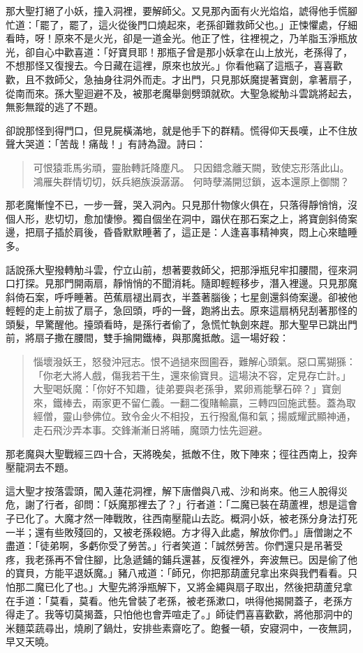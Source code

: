 那大聖打絕了小妖，撞入洞裡，要解師父。又見那內面有火光焰焰，諕得他手慌腳忙道：「罷了，罷了，這火從後門口燒起來，老孫卻難救師父也。」正悚懼處，仔細看時，呀！原來不是火光，卻是一道金光。他正了性，往裡視之，乃羊脂玉淨瓶放光，卻自心中歡喜道：「好寶貝耶！那瓶子曾是那小妖拿在山上放光，老孫得了，不想那怪又復搜去。今日藏在這裡，原來也放光。」你看他竊了這瓶子，喜喜歡歡，且不救師父，急抽身往洞外而走。才出門，只見那妖魔提著寶劍，拿著扇子，從南而來。孫大聖迴避不及，被那老魔舉劍劈頭就砍。大聖急縱觔斗雲跳將起去，無影無蹤的逃了不題。

卻說那怪到得門口，但見屍橫滿地，就是他手下的群精。慌得仰天長嘆，止不住放聲大哭道：「苦哉！痛哉！」有詩為證。詩曰：
\begin{quote}
可恨猿乖馬劣頑，靈胎轉託降塵凡。
只因錯念離天闕，致使忘形落此山。
鴻雁失群情切切，妖兵絕族淚潺潺。
何時孽滿開愆鎖，返本還原上御關？
\end{quote}

那老魔慚惶不已，一步一聲，哭入洞內。只見那什物傢火俱在，只落得靜悄悄，沒個人形，悲切切，愈加悽慘。獨自個坐在洞中，蹋伏在那石案之上，將寶劍斜倚案邊，把扇子插於肩後，昏昏默默睡著了，這正是：人逢喜事精神爽，悶上心來瞌睡多。

話說孫大聖撥轉觔斗雲，佇立山前，想著要救師父，把那淨瓶兒牢扣腰間，徑來洞口打探。見那門開兩扇，靜悄悄的不聞消耗。隨即輕輕移步，潛入裡邊。只見那魔斜倚石案，呼呼睡著。芭蕉扇褪出肩衣，半蓋著腦後；七星劍還斜倚案邊。卻被他輕輕的走上前拔了扇子，急回頭，呼的一聲，跑將出去。原來這扇柄兒刮著那怪的頭髮，早驚醒他。擡頭看時，是孫行者偷了，急慌忙執劍來趕。那大聖早已跳出門前，將扇子撒在腰間，雙手掄開鐵棒，與那魔抵敵。這一場好殺：
\begin{quote}
惱壞潑妖王，怒發沖冠志。恨不過撾來囫圇吞，難解心頭氣。惡口罵猢猻：「你老大將人戲，傷我若干生，還來偷寶貝。這場決不容，定見存亡計。」大聖喝妖魔：「你好不知趣，徒弟要與老孫爭，累卵焉能擊石碎？」寶劍來，鐵棒去，兩家更不留仁義。一翻二復賭輸贏，三轉四回施武藝。蓋為取經僧，靈山參佛位。致令金火不相投，五行撥亂傷和氣；揚威耀武顯神通，走石飛沙弄本事。交鋒漸漸日將晡，魔頭力怯先迴避。
\end{quote}

那老魔與大聖戰經三四十合，天將晚矣，抵敵不住，敗下陣來；徑往西南上，投奔壓龍洞去不題。

這大聖才按落雲頭，闖入蓮花洞裡，解下唐僧與八戒、沙和尚來。他三人脫得災危，謝了行者，卻問：「妖魔那裡去了？」行者道：「二魔已裝在葫蘆裡，想是這會子已化了。大魔才然一陣戰敗，往西南壓龍山去訖。概洞小妖，被老孫分身法打死一半；還有些敗殘回的，又被老孫殺絕。方才得入此處，解放你們。」唐僧謝之不盡道：「徒弟啊，多虧你受了勞苦。」行者笑道：「誠然勞苦。你們還只是吊著受疼，我老孫再不曾住腳，比急遞鋪的鋪兵還甚，反復裡外，奔波無已。因是偷了他的寶貝，方能平退妖魔。」豬八戒道：「師兄，你把那葫蘆兒拿出來與我們看看。只怕那二魔已化了也。」大聖先將淨瓶解下，又將金繩與扇子取出，然後把葫蘆兒拿在手道：「莫看，莫看。他先曾裝了老孫，被老孫漱口，哄得他揭開蓋子，老孫方得走了。我等切莫揭蓋，只怕他也會弄喧走了。」師徒們喜喜歡歡，將他那洞中的米麵菜蔬尋出，燒刷了鍋灶，安排些素齋吃了。飽餐一頓，安寢洞中，一夜無詞，早又天曉。

